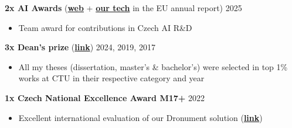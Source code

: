 \documentclass[12pt,a4paper]{article}
\newcommand\Colorhreff[3][reff]{\href{#2}{\color{#1}#3}}
\newcommand{\parskipsmall}{0.02cm}
\begin{document}
\begin{paracol}{2}
\vspace{\parskipsmall}
\noindent
\textbf{2x AI Awards} (\Colorhreff{https://www.aiawards.cz/\#vysledky}{\textbf{web}} + \Colorhreff{https://ec.europa.eu/stories/first-year-office/\#wtEtransModal}{\textbf{our tech}} in the EU annual report) \hfill 2025
\begin{itemize}
  \item Team award for contributions in Czech AI R\&D
\end{itemize}

\vspace{\parskipsmall}
\noindent
\textbf{3x Dean's prize} (\Colorhreff{https://cyber.felk.cvut.cz/news/pavel-petracek-received-the-deans-award-for-prestigious-dissertation/}{\textbf{link}}) \hfill 2024, 2019, 2017
\begin{itemize}
  \item All my theses (dissertation, master's \& bachelor's) were selected in top 1\% works at CTU in their respective category and year
\end{itemize}

\vspace{\parskipsmall}
\noindent
\textbf{1x Czech National Excellence Award M17+} \hfill 2022
\begin{itemize}
  \item Excellent international evaluation of our Dronument solution (\Colorhreff{https://mrs.fel.cvut.cz/dg18p02ovv069-fvz}{\textbf{link}})
\end{itemize}

\end{paracol}
\end{document}
